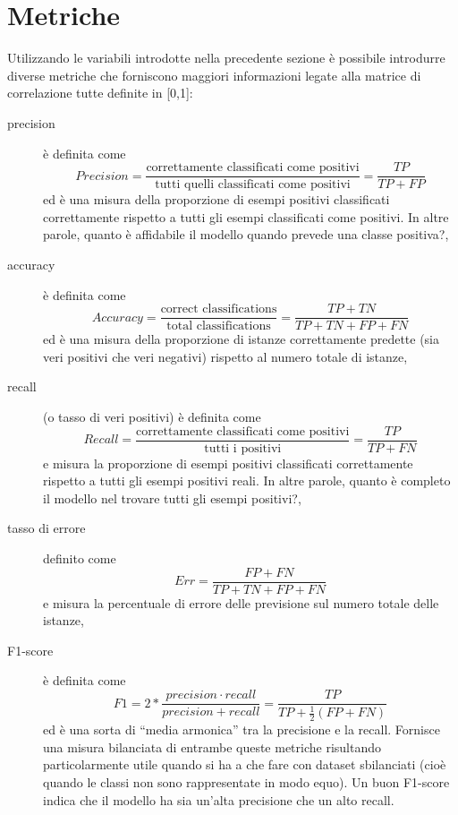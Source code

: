 \section{Metriche}
    Utilizzando le variabili introdotte nella precedente sezione è possibile introdurre diverse metriche che forniscono maggiori informazioni legate alla matrice di correlazione tutte definite in [0,1]:
    \begin{description}
        \item[precision] è definita come
        \begin{equation}
            Precision = \frac{\text{correttamente classificati come positivi}}{\text{tutti quelli classificati come positivi}} = \frac{TP}{TP + FP}
        \end{equation}
        ed è una misura della proporzione di esempi positivi classificati correttamente rispetto a tutti gli esempi classificati come positivi. In altre parole, quanto è affidabile il modello quando prevede una classe positiva?,


        \item[accuracy] è definita come
        \begin{equation}
            Accuracy = \frac{\text{correct classifications}}{\text{total classifications}} = \frac{TP + TN}{TP + TN + FP + FN}
        \end{equation}
        ed è una misura della proporzione di istanze correttamente predette (sia veri positivi che veri negativi) rispetto al numero totale di istanze,

        \item[recall] (o tasso di veri positivi) è definita come 
        \begin{equation}
            Recall = \frac{\text{correttamente classificati come positivi}}{\text{tutti i positivi}} = \frac{TP}{TP + FN}
        \end{equation}
        e misura la proporzione di esempi positivi classificati correttamente rispetto a tutti gli esempi positivi reali. In altre parole, quanto è completo il modello nel trovare tutti gli esempi positivi?,

        \item[tasso di errore] definito come
        \begin{equation}
            Err = \frac{FP + FN}{TP + TN + FP + FN}
        \end{equation}
        e misura la percentuale di errore delle previsione sul numero totale delle istanze,

        \item[F1-score] è definita come 
        \begin{equation}
            F1 = 2 * \frac{precision \cdot recall}{precision + recall} = \frac{TP}{TP + \frac{1}{2}(FP + FN)}
        \end{equation}
        ed è una sorta di ``media armonica'' tra la precisione e la recall. Fornisce una misura bilanciata di entrambe queste metriche risultando particolarmente utile quando si ha a che fare con dataset sbilanciati (cioè quando le classi non sono rappresentate in modo equo). Un buon F1-score indica che il modello ha sia un'alta precisione che un alto recall.
    \end{description}

